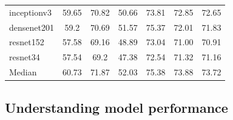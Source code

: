 \begin{table}[H]
\begin{tabular}{lcccccc}
        \\
        inceptionv3             & 59.65          & 70.82          & 50.66
                                & 73.81          & 72.85          & 72.65
        \\
        densenet201             & 59.2           & 70.69          & 51.57
                                & 75.37          & 72.01          & 71.83
        \\
        resnet152               & 57.58          & 69.16          & 48.89
                                & 73.04          & 71.00          &
        70.91
        \\
        resnet34                & 57.54          & 69.2           & 47.38
                                & 72.54          & 71.32          & 71.16
        \\
        \hdashline
        Median                  & 60.73          & 71.87          & 52.03
                                & 75.38          & 73.88          & 73.72
        \\
        \bottomrule
    \end{tabular}
\end{table}

\subsection{Understanding model performance}

